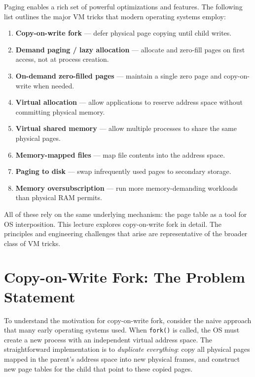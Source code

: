 \documentclass[11pt]{article}
\begin{document}
Paging enables a rich set of powerful optimizations and features. The following list outlines the major VM tricks that modern operating systems employ:

\begin{enumerate}
    \item \textbf{Copy-on-write fork} --- defer physical page copying until child writes.
    \item \textbf{Demand paging / lazy allocation} --- allocate and zero-fill pages on first access, not at process creation.
    \item \textbf{On-demand zero-filled pages} --- maintain a single zero page and copy-on-write when needed.
    \item \textbf{Virtual allocation} --- allow applications to reserve address space without committing physical memory.
    \item \textbf{Virtual shared memory} --- allow multiple processes to share the same physical pages.
    \item \textbf{Memory-mapped files} --- map file contents into the address space.
    \item \textbf{Paging to disk} --- swap infrequently used pages to secondary storage.
    \item \textbf{Memory oversubscription} --- run more memory-demanding workloads than physical RAM permits.
\end{enumerate}

All of these rely on the same underlying mechanism: the page table as a tool for OS interposition. This lecture explores copy-on-write fork in detail. The principles and engineering challenges that arise are representative of the broader class of VM tricks.

\section{Copy-on-Write Fork: The Problem Statement}

To understand the motivation for copy-on-write fork, consider the naive approach that many early operating systems used. When \texttt{fork()} is called, the OS must create a new process with an independent virtual address space. The straightforward implementation is to \emph{duplicate everything}: copy all physical pages mapped in the parent's address space into new physical frames, and construct new page tables for the child that point to these copied pages.
\end{document}
